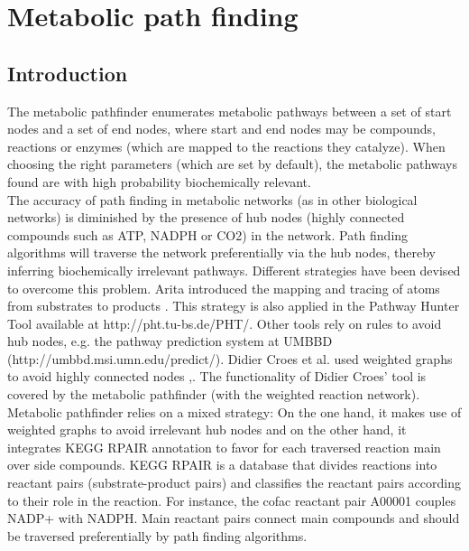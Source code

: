 \chapter{Metabolic path finding}

\section{Introduction}

The metabolic pathfinder enumerates metabolic pathways between a set of start nodes
and a set of end nodes, where start and end nodes may be compounds, reactions or enzymes (which are mapped to the reactions
they catalyze). When choosing the right parameters (which are set by default), the metabolic pathways found are with high
probability biochemically relevant.\\

The accuracy of path finding in metabolic networks (as in other biological networks) is diminished by the presence of
hub nodes (highly connected compounds such as ATP, NADPH or CO2) in the network.
Path finding algorithms will traverse the network preferentially via the hub nodes,
thereby inferring biochemically irrelevant pathways.
Different strategies have been devised to overcome this problem. Arita introduced the mapping and tracing of atoms
from substrates to products \cite{Arita2003}. This strategy is also applied in the Pathway Hunter Tool available at http://pht.tu-bs.de/PHT/.
Other tools rely on rules to avoid hub nodes, e.g. the pathway prediction system at UMBBD (http://umbbd.msi.umn.edu/predict/).
Didier Croes et al. used weighted graphs to avoid highly connected nodes \cite{croes05},\cite{croes06}.
The functionality of Didier Croes' tool is covered by the metabolic pathfinder (with the weighted reaction network).\\

Metabolic pathfinder relies on a mixed strategy: On the one hand, it makes use of weighted graphs to avoid irrelevant
hub nodes and on the other hand, it integrates KEGG RPAIR annotation \cite{Kotera2004} to favor for each traversed
reaction main over side compounds.
KEGG RPAIR is a database that divides reactions into reactant pairs (substrate-product pairs) and classifies the reactant
pairs according to their role in the reaction. For instance, the cofac reactant pair A00001 couples NADP+ with NADPH.
Main reactant pairs connect main compounds and should be traversed preferentially by path finding algorithms.\\

